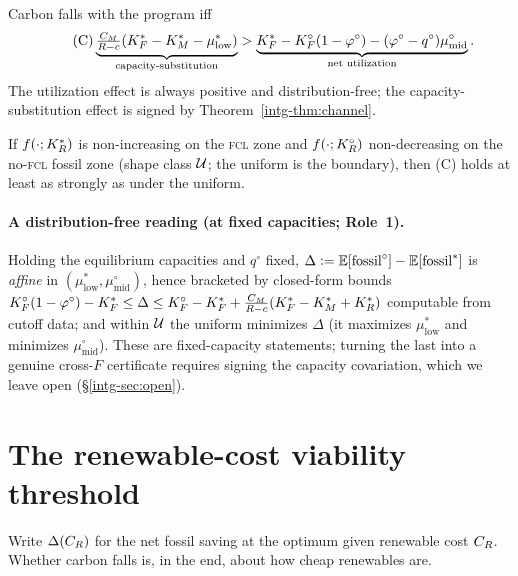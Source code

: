 \begin{proposition}\label{intg-prop:C}
Carbon falls with the program iff
\begin{equation}\tag{C}\label{intg-eq:C}
  \underbrace{\tfrac{C_M}{R-c}(K_F^{*}-K_M^{*}-\mu^{*}_{\mathrm{low}})}_{\text{capacity-substitution}}
  >
  \underbrace{K_F^{*}-K_F^{\circ}(1-\varphi^{\circ})-(\varphi^{\circ}-q^{\circ})\mu^{\circ}_{\mathrm{mid}}}_{\text{net utilization}}.
\end{equation}
The utilization effect is always positive and distribution-free; the
capacity-substitution effect is signed by Theorem~\ref{intg-thm:channel}.
\end{proposition}

\begin{corollary}\label{intg-cor:suff}
If $f(\cdot;K_R^{*})$ is non-increasing on the \textsc{fcl} zone and $f(\cdot;K_R^{\circ})$
non-decreasing on the no-\textsc{fcl} fossil zone (shape class $\mathcal U$; the uniform
is the boundary), then (C) holds at least as strongly as under the uniform.
\end{corollary}

\paragraph{A distribution-free reading (at fixed capacities; Role~1).} Holding the
equilibrium capacities and $q^{\circ}$ fixed, $\Delta\vcentcolon=\mathbb{E}[\text{fossil}^{\circ}]-\mathbb{E}[\text{fossil}^{*}]$
is \emph{affine} in $(\mu^{*}_{\mathrm{low}},\mu^{\circ}_{\mathrm{mid}})$, hence
bracketed by closed-form bounds
$K_F^{\circ}(1-\varphi^{\circ})-K_F^{*}\le\Delta\le K_F^{\circ}-K_F^{*}+\tfrac{C_M}{R-c}(K_F^{*}-K_M^{*}+K_R^{*})$
computable from cutoff data; and within $\mathcal U$ the uniform minimizes $\Delta$
(it maximizes $\mu^{*}_{\mathrm{low}}$ and minimizes $\mu^{\circ}_{\mathrm{mid}}$).
These are fixed-capacity statements; turning the last into a genuine cross-$F$
certificate requires signing the capacity covariation, which we leave open
(\S\ref{intg-sec:open}).

\section{The renewable-cost viability threshold}\label{intg-sec:threshold}

Write $\Delta(C_R)$ for the net fossil saving at the optimum given renewable cost
$C_R$. Whether carbon falls is, in the end, about how cheap renewables are.

